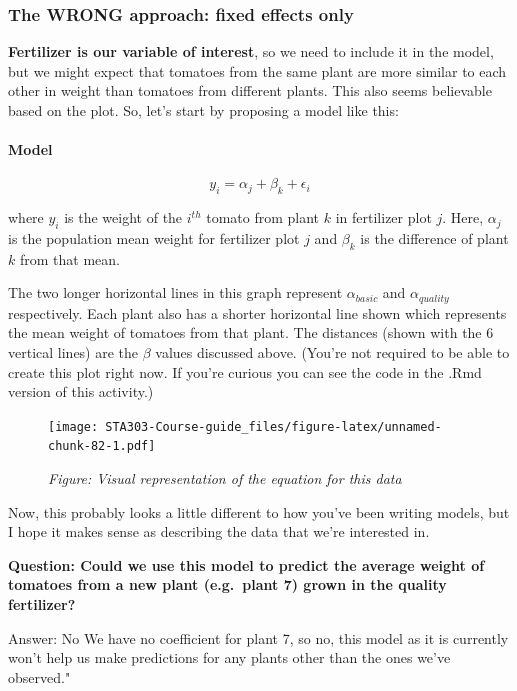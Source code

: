 \documentclass[
  openany]{book}
\begin{document}
\hypertarget{the-wrong-approach-fixed-effects-only}{%
\subsubsection{The WRONG approach: fixed effects only}\label{the-wrong-approach-fixed-effects-only}}

\textbf{Fertilizer is our variable of interest}, so we need to include it in the model, but we might expect that tomatoes from the same plant are more similar to each other in weight than tomatoes from different plants. This also seems believable based on the plot. So, let's start by proposing a model like this:

\hypertarget{model}{%
\paragraph{Model}\label{model}}

\[y_{i} = \alpha_j + \beta_k + \epsilon_{i}  \]

where \(y_{i}\) is the weight of the \(i^{th}\) tomato from plant \(k\) in fertilizer plot \(j\). Here, \(\alpha_j\) is the population mean weight for fertilizer plot \(j\) and \(\beta_k\) is the difference of plant \(k\) from that mean.

The two longer horizontal lines in this graph represent \(\alpha_{basic}\) and \(\alpha_{quality}\) respectively. Each plant also has a shorter horizontal line shown which represents the mean weight of tomatoes from that plant. The distances (shown with the 6 vertical lines) are the \(\beta\) values discussed above. (You're not required to be able to create this plot right now. If you're curious you can see the code in the .Rmd version of this activity.)

\begin{figure}
\centering
\texttt{[image: STA303-Course-guide\_files/figure-latex/unnamed-chunk-82-1.pdf]}
\caption{\label{fig:unnamed-chunk-82}\emph{Figure: Visual representation of the equation for this data}}
\end{figure}

Now, this probably looks a little different to how you've been writing models, but I hope it makes sense as describing the data that we're interested in.

\textbf{Question: Could we use this model to predict the average weight of tomatoes from a new plant (e.g.~plant 7) grown in the quality fertilizer?}

Answer: No We have no coefficient for plant 7, so no, this model as it is currently won't help us make predictions for any plants other than the ones we've observed."
\end{document}
